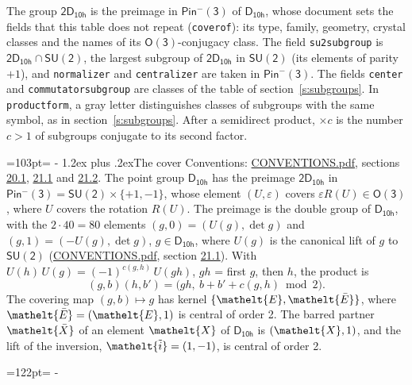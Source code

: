 \documentclass[10pt,a4paper]{article}
\makeatletter
\renewcommand\section{\@startsection{section}{1}{\z@}{-3ex plus -1ex minus -.2ex}%
  {1.2ex plus .2ex}{\normalfont\large\sffamily\bfseries\color{parttitle}}}
\newcommand{\needspace}[1]{\par\penalty-100\begingroup\dimen0=#1\relax\dimen2=\pagegoal
  \advance\dimen2-\pagetotal\ifdim\dimen0>\dimen2\relax\ifdim\dimen2>0pt\vfil\break\fi\fi
  \endgroup}
\numberwithin{equation}{section}
\newcommand{\eltfont}[1]{{\let\sigma\eltsigma\mathelt{#1}}}
\newcommand{\grp}[1]{\mathsf{#1}}
\newcommand{\elt}[1]{\eltfont{#1}}
\newcommand{\dirprod}{\times}
\newcommand{\barred}[1]{\bar{#1}}
\newcommand{\lift}[1]{\tilde{#1}}
\makeatother
\begin{document}
\leavevmode\label{n:element.inversion}\label{n:group.preimage}The group $\grp{2D_{10h}}$ is the preimage in $\grp{Pin^{-}(3)}$ of \href{../../../rotation/data/pdf/D10h.pdf}{$\grp{D_{10h}}$}, whose document sets the fields that this table does not repeat (\texttt{coverof}): its type, family, geometry, crystal classes and the names of its \href{../../../rotation/data/pdf/O3.pdf}{$\grp{O(3)}$}-conjugacy class. The field \texttt{su2subgroup} is $\grp{2D_{10h}} \cap \grp{SU(2)}$, the largest subgroup of $\grp{2D_{10h}}$ in $\grp{SU(2)}$ (its elements of parity $+1$), and \texttt{normalizer} and \texttt{centralizer} are taken in $\grp{Pin^{-}(3)}$. The fields \texttt{center} and \texttt{commutatorsubgroup} are classes of the table of section~\ref{s:subgroups}.
In \texttt{productform}, a gray letter distinguishes classes of subgroups with the same symbol, as in section~\ref{s:subgroups}. \label{n:index.conjugates.c}After a semidirect product, ${\times}c$ is the number $c > 1$ of subgroups conjugate to its second factor.
\needspace{103pt}
\section{The cover}\label{s:cover}
Conventions: \href{../../CONVENTIONS.pdf}{CONVENTIONS.pdf}, sections \href{../../CONVENTIONS.pdf\#conv.20.1}{20.1}, \href{../../CONVENTIONS.pdf\#conv.21.1}{21.1} and \href{../../CONVENTIONS.pdf\#conv.21.2}{21.2}.
\leavevmode\label{n:group.pin.minus}\label{n:group.su2}\label{n:local.pin.sign}\label{n:matrix.covered}\label{n:matrix.lift.su2}\label{n:index.bar}The point group $\grp{D_{10h}}$ has the preimage $\grp{2D_{10h}}$ in $\grp{Pin^{-}(3)} = \grp{SU(2)} \dirprod \{+1, -1\}$, whose element $(U, \varepsilon)$ covers $\varepsilon R(U) \in \grp{O(3)}$, where $U$ covers the rotation $R(U)$. The preimage is the double group of $\grp{D_{10h}}$, with the $2 \cdot 40 = 80$ elements $(g, 0) = (U(g), \det g)$ and $(g, 1) = (-U(g), \det g)$, $g \in \grp{D_{10h}}$, where $U(g)$ is the canonical lift of $g$ to $\grp{SU(2)}$ (\href{../../CONVENTIONS.pdf}{CONVENTIONS.pdf}, section \href{../../CONVENTIONS.pdf\#conv.21.1}{21.1}). \label{n:function.cocycle}With $U(h)\,U(g) = (-1)^{c(g,h)}\,U(gh)$, $gh$ = first $g$, then $h$, the product is
\begin{equation}\label{e:product}(g, b)(h, b') = \bigl(gh,\ b + b' + c(g, h) \bmod 2\bigr).\end{equation}
\leavevmode\label{n:mark.bar}The covering map $(g, b) \mapsto g$ has kernel $\{\elt{E}, \elt{\barred{E}}\}$, where $\elt{\barred{E}} = (\elt{E}, 1)$ is central of order 2. \label{n:element.named}\label{n:mark.lift}The barred partner $\elt{\barred{X}}$ of an element $\elt{X}$ of $\grp{D_{10h}}$ is $(\elt{X}, 1)$, and the lift of the inversion, $\elt{\lift{i}} = (1, -1)$, is central of order 2.
\needspace{122pt}
\end{document}
